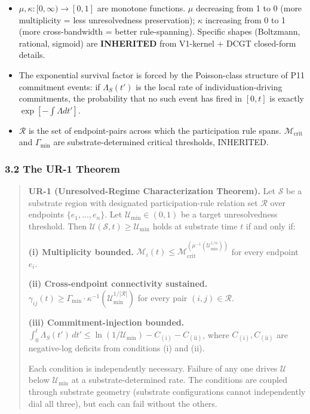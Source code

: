 \documentclass[
  11pt,
  a4paper,
]{article}
\providecommand{\tightlist}{%
  \setlength{\itemsep}{0pt}\setlength{\parskip}{0pt}}
\begin{document}
\begin{itemize}
\tightlist
\item
  \(\mu, \kappa : [0,\infty) \to [0,1]\) are monotone functions. \(\mu\)
  decreasing from 1 to 0 (more multiplicity = less unresolvedness
  preservation); \(\kappa\) increasing from 0 to 1 (more cross-bandwidth
  = better rule-spanning). Specific shapes (Boltzmann, rational,
  sigmoid) are \textbf{INHERITED} from V1-kernel + DCGT closed-form
  details.
\item
  The exponential survival factor is forced by the Poisson-class
  structure of P11 commitment events: if \(\Lambda_{S}(t')\) is the
  local rate of individuation-driving commitments, the probability that
  no such event has fired in \([0,t]\) is exactly
  \(\exp[-\int \Lambda dt']\).
\item
  \(\mathcal{R}\) is the set of endpoint-pairs across which the
  participation rule spans. \(\mathcal{M}_{\mathrm{crit}}\) and
  \(\Gamma_{\mathrm{min}}\) are substrate-determined critical
  thresholds, INHERITED.
\end{itemize}

\subsubsection{3.2 The UR-1 Theorem}\label{the-ur-1-theorem}

\begin{quote}
\textbf{UR-1 (Unresolved-Regime Characterization Theorem).} Let
\(\mathcal{S}\) be a substrate region with designated participation-rule
relation set \(\mathcal{R}\) over endpoints \(\{e_1, \ldots, e_n\}\).
Let \(\mathcal{U}_{\mathrm{min}} \in (0,1)\) be a target unresolvedness
threshold. Then
\(\mathcal{U}(\mathcal{S},t) \geq \mathcal{U}_{\mathrm{min}}\) holds at
substrate time \(t\) if and only if:

\textbf{(i) Multiplicity bounded.}
\(\mathcal{M}_i(t) \leq \mathcal{M}_{\mathrm{crit}}^{(\mu^{-1}(\mathcal{U}_{\mathrm{min}}^{1/n}))}\)
for every endpoint \(e_i\).

\textbf{(ii) Cross-endpoint connectivity sustained.}
\(\gamma_{ij}(t) \geq \Gamma_{\mathrm{min}} \cdot \kappa^{-1}(\mathcal{U}_{\mathrm{min}}^{1/|\mathcal{R}|})\)
for every pair \((i,j) \in \mathcal{R}\).

\textbf{(iii) Commitment-injection bounded.}
\(\int_0^t \Lambda_{S}(t')\,dt' \leq \ln(1/\mathcal{U}_{\mathrm{min}}) - C_{(\mathrm{i})} - C_{(\mathrm{ii})}\),
where \(C_{(\mathrm{i})}, C_{(\mathrm{ii})}\) are negative-log deficits
from conditions (i) and (ii).

Each condition is independently necessary. Failure of any one drives
\(\mathcal{U}\) below \(\mathcal{U}_{\mathrm{min}}\) at a
substrate-determined rate. The conditions are coupled through substrate
geometry (substrate configurations cannot independently dial all three),
but each can fail without the others.
\end{quote}
\end{document}

